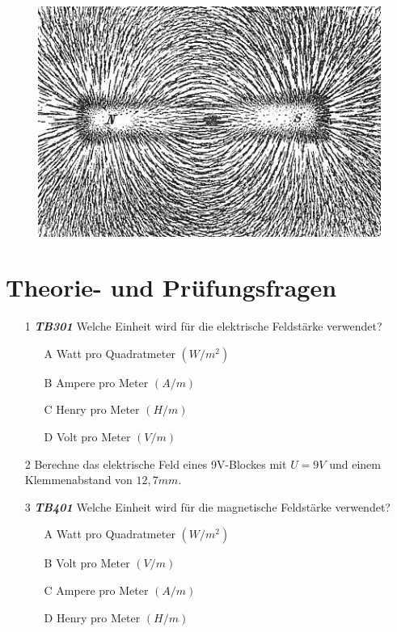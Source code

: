 \begin{figure}
 \vspace{-7cm}
  \includegraphics[scale=0.35]{Felder/Bilder/Magnet.jpg}
 \vspace{-7cm}
\end{figure}

\section*{Theorie- und Prüfungsfragen}


\begin{enumerate} 
\itemsep1pt\parskip0pt
\item[1] \emph{\textbf{TB301}} Welche Einheit wird für die elektrische Feldstärke verwendet?
	\begin{enumerate}
	\itemsep1pt\parskip0pt
		\item[A] Watt pro Quadratmeter $(W/m^2)$
		\item[B] Ampere pro Meter $(A/m)$
		\item[C] Henry pro Meter $(H/m)$
		\item[D] Volt pro Meter $(V/m)$
	\end{enumerate}
\end{enumerate}

\begin{enumerate} 
\itemsep1pt\parskip0pt
\item[2] Berechne das elektrische Feld eines 9V-Blockes mit $U = 9V$ und einem Klemmenabstand von $12,7mm$.
\end{enumerate}

\begin{enumerate} 
\itemsep1pt\parskip0pt
\item[3] \emph{\textbf{TB401}} Welche Einheit wird für die magnetische Feldstärke verwendet?
	\begin{enumerate}
	\itemsep1pt\parskip0pt
		\item[A] Watt pro Quadratmeter $(W/m^2)$
		\item[B] Volt pro Meter $(V/m)$
		\item[C] Ampere pro Meter $(A/m)$
		\item[D] Henry pro Meter $(H/m)$
	\end{enumerate}
\end{enumerate}

